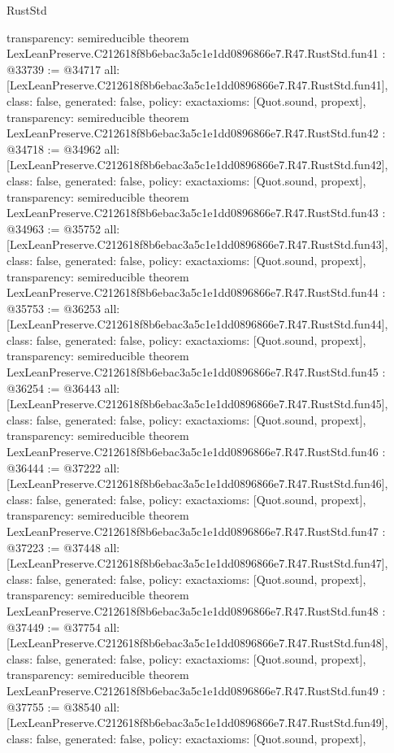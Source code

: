 \begin{lexlean}{RustStd}
\begin{coremodule}
{  transparency: semireducible
}
theorem LexLeanPreserve.C212618f8b6ebac3a5c1e1dd0896866e7.R47.RustStd.fun41 : @33739 := @34717 {
  all: [LexLeanPreserve.C212618f8b6ebac3a5c1e1dd0896866e7.R47.RustStd.fun41],
  class: false,
  generated: false,
  policy: exact{axioms: [Quot.sound, propext]},
  transparency: semireducible
}
theorem LexLeanPreserve.C212618f8b6ebac3a5c1e1dd0896866e7.R47.RustStd.fun42 : @34718 := @34962 {
  all: [LexLeanPreserve.C212618f8b6ebac3a5c1e1dd0896866e7.R47.RustStd.fun42],
  class: false,
  generated: false,
  policy: exact{axioms: [Quot.sound, propext]},
  transparency: semireducible
}
theorem LexLeanPreserve.C212618f8b6ebac3a5c1e1dd0896866e7.R47.RustStd.fun43 : @34963 := @35752 {
  all: [LexLeanPreserve.C212618f8b6ebac3a5c1e1dd0896866e7.R47.RustStd.fun43],
  class: false,
  generated: false,
  policy: exact{axioms: [Quot.sound, propext]},
  transparency: semireducible
}
theorem LexLeanPreserve.C212618f8b6ebac3a5c1e1dd0896866e7.R47.RustStd.fun44 : @35753 := @36253 {
  all: [LexLeanPreserve.C212618f8b6ebac3a5c1e1dd0896866e7.R47.RustStd.fun44],
  class: false,
  generated: false,
  policy: exact{axioms: [Quot.sound, propext]},
  transparency: semireducible
}
theorem LexLeanPreserve.C212618f8b6ebac3a5c1e1dd0896866e7.R47.RustStd.fun45 : @36254 := @36443 {
  all: [LexLeanPreserve.C212618f8b6ebac3a5c1e1dd0896866e7.R47.RustStd.fun45],
  class: false,
  generated: false,
  policy: exact{axioms: [Quot.sound, propext]},
  transparency: semireducible
}
theorem LexLeanPreserve.C212618f8b6ebac3a5c1e1dd0896866e7.R47.RustStd.fun46 : @36444 := @37222 {
  all: [LexLeanPreserve.C212618f8b6ebac3a5c1e1dd0896866e7.R47.RustStd.fun46],
  class: false,
  generated: false,
  policy: exact{axioms: [Quot.sound, propext]},
  transparency: semireducible
}
theorem LexLeanPreserve.C212618f8b6ebac3a5c1e1dd0896866e7.R47.RustStd.fun47 : @37223 := @37448 {
  all: [LexLeanPreserve.C212618f8b6ebac3a5c1e1dd0896866e7.R47.RustStd.fun47],
  class: false,
  generated: false,
  policy: exact{axioms: [Quot.sound, propext]},
  transparency: semireducible
}
theorem LexLeanPreserve.C212618f8b6ebac3a5c1e1dd0896866e7.R47.RustStd.fun48 : @37449 := @37754 {
  all: [LexLeanPreserve.C212618f8b6ebac3a5c1e1dd0896866e7.R47.RustStd.fun48],
  class: false,
  generated: false,
  policy: exact{axioms: [Quot.sound, propext]},
  transparency: semireducible
}
theorem LexLeanPreserve.C212618f8b6ebac3a5c1e1dd0896866e7.R47.RustStd.fun49 : @37755 := @38540 {
  all: [LexLeanPreserve.C212618f8b6ebac3a5c1e1dd0896866e7.R47.RustStd.fun49],
  class: false,
  generated: false,
  policy: exact{axioms: [Quot.sound, propext]},
}
\end{coremodule}
\end{lexlean}
